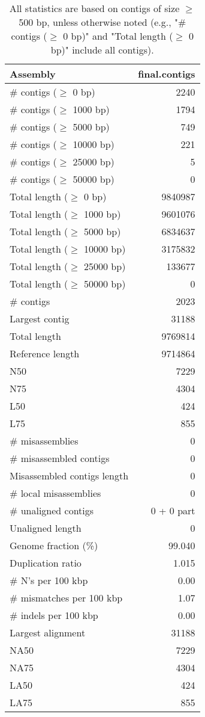 \documentclass[12pt,a4paper]{article}
\begin{document}
\begin{table}[ht]
\begin{center}
\caption{All statistics are based on contigs of size $\geq$ 500 bp, unless otherwise noted (e.g., "\# contigs ($\geq$ 0 bp)" and "Total length ($\geq$ 0 bp)" include all contigs).}
\begin{tabular}{|l*{1}{|r}|}
\hline
Assembly & final.contigs \\ \hline
\# contigs ($\geq$ 0 bp) & 2240 \\ \hline
\# contigs ($\geq$ 1000 bp) & 1794 \\ \hline
\# contigs ($\geq$ 5000 bp) & 749 \\ \hline
\# contigs ($\geq$ 10000 bp) & 221 \\ \hline
\# contigs ($\geq$ 25000 bp) & 5 \\ \hline
\# contigs ($\geq$ 50000 bp) & 0 \\ \hline
Total length ($\geq$ 0 bp) & 9840987 \\ \hline
Total length ($\geq$ 1000 bp) & 9601076 \\ \hline
Total length ($\geq$ 5000 bp) & 6834637 \\ \hline
Total length ($\geq$ 10000 bp) & 3175832 \\ \hline
Total length ($\geq$ 25000 bp) & 133677 \\ \hline
Total length ($\geq$ 50000 bp) & 0 \\ \hline
\# contigs & 2023 \\ \hline
Largest contig & 31188 \\ \hline
Total length & 9769814 \\ \hline
Reference length & 9714864 \\ \hline
N50 & 7229 \\ \hline
N75 & 4304 \\ \hline
L50 & 424 \\ \hline
L75 & 855 \\ \hline
\# misassemblies & 0 \\ \hline
\# misassembled contigs & 0 \\ \hline
Misassembled contigs length & 0 \\ \hline
\# local misassemblies & 0 \\ \hline
\# unaligned contigs & 0 + 0 part \\ \hline
Unaligned length & 0 \\ \hline
Genome fraction (\%) & 99.040 \\ \hline
Duplication ratio & 1.015 \\ \hline
\# N's per 100 kbp & 0.00 \\ \hline
\# mismatches per 100 kbp & 1.07 \\ \hline
\# indels per 100 kbp & 0.00 \\ \hline
Largest alignment & 31188 \\ \hline
NA50 & 7229 \\ \hline
NA75 & 4304 \\ \hline
LA50 & 424 \\ \hline
LA75 & 855 \\ \hline
\end{tabular}
\end{center}
\end{table}
\end{document}
